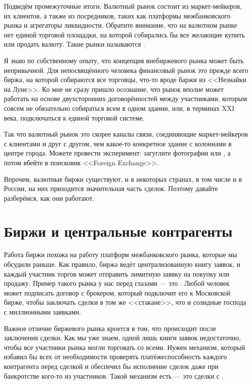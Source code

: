 Подведём промежуточные итоги. Валютный рынок состоит из маркет-мейкеров, их
клиентов, а также из посредников, таких как платформы межбанковского рынка и
агрегаторы ликвидности. Обратите внимание, что на валютном рынке нет единой
торговой площадки, на которой собирались бы все желающие купить или продать
валюту. Такие рынки называются .

Я знаю по собственному опыту, что концепция внебиржевого рынка может быть
непривычной. Для непосвящённого человека финансовый рынок это прежде всего
биржа, на которой собираются все торговцы, что-то вроде баржи из <<Незнайки на
Луне>>. Ко мне не сразу пришло осознание, что рынок вполне может работать на
основе двухсторонних договорённостей между участниками, которым совсем не
обязательно собираться всем в одном здании, или, в терминах \RN{21} века,
подключаться к единой торговой системе.

Так что валютный рынок это скорее каналы связи, соединяющие маркет-мейкеров с
клиентами и друг с другом, чем какое-то конкретное здание с колоннами в центре
города. Можете провести эксперимент: загуглите фотографии  или , а потом вбейте в поисковик <<Foreign
Exchange>>.

Впрочем, валютные биржи существуют, и в некоторых странах, в том числе и в
России, на них приходится значительная часть сделок. Поэтому давайте разберёмся,
как они работают.

\section*{Биржи и центральные контрагенты}

Работа биржи похожа на работу платформ межбанковского рынка, которые мы обсудили
раньше. Как правило, биржа ведёт централизованную книгу заявок, и каждый
участник торгов может отправить лимитную заявку на покупку или продажу. Пример
такого рынка у нас перед глазами --- это . Любой человек может подписать
договор с брокером, который подключит его к Московской бирже, чтобы заключать
сделки в том же <<стакане>>, что и солидные господа с миллионными заявками.

Важное отличие биржевого рынка кроется в том, что происходит после заключения
сделки. Как мы уже знаем, одной лишь книги заявок недостаточно, чтобы все
участники рынка могли торговать со всеми. Нужен механизм, который избавил бы
всех от необходимости проверять платёжеспособность каждого контрагента перед
сделкой и обеспечил бы исполнение сделок даже при банкротстве кого-то из
участников. Такой механизм есть --- это сделки с .

